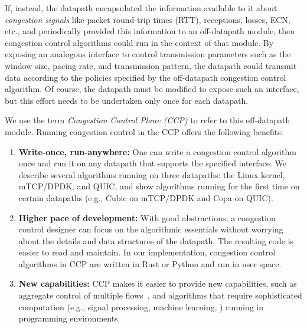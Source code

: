 
\smallskip
If, instead, the datapath encapsulated the information available to it about {\em congestion signals} like packet round-trip times (RTT), receptions, losses, ECN, etc., and periodically provided this information to an off-datapath module, then congestion control algorithms could run in the context of that module. 
By exposing an analogous interface to control transmission parameters such as the window size, pacing rate, and transmission pattern, the datapath could transmit data according to the policies specified by the off-datapath congestion control algorithm. Of course, the datapath must be modified to expose
such an interface, but this effort needs to be undertaken only once for each datapath.

We use the term {\em Congestion Control Plane (CCP)} to refer to this off-datapath module. Running congestion control in the CCP offers the following benefits:
\begin{enumerate}
    \item {\bf Write-once, run-anywhere:} One can write a congestion control algorithm once and run it on any datapath that supports the specified interface. 
    We describe several algorithms running on three datapaths: the Linux kernel, mTCP/DPDK, and QUIC, and show algorithms running for the first time on certain datapaths (e.g., Cubic on mTCP/DPDK and Copa on QUIC).
    \item {\bf Higher pace of development:} With good abstractions,
      a congestion control designer can focus on the algorithmic essentials
      without worrying about the details and data structures of the
      datapath. The resulting code is easier to read and maintain. In our implementation, congestion control algorithms in CCP are written in Rust or Python and run in user space. 
    \item {\bf New capabilities:} CCP makes it easier to provide new
      capabilities, such as aggregate control of multiple flows~\cite{cm}, and algorithms that require sophisticated computation (e.g., signal processing, machine learning, \etc) running in \userspace programming environments. 
\end{enumerate}

